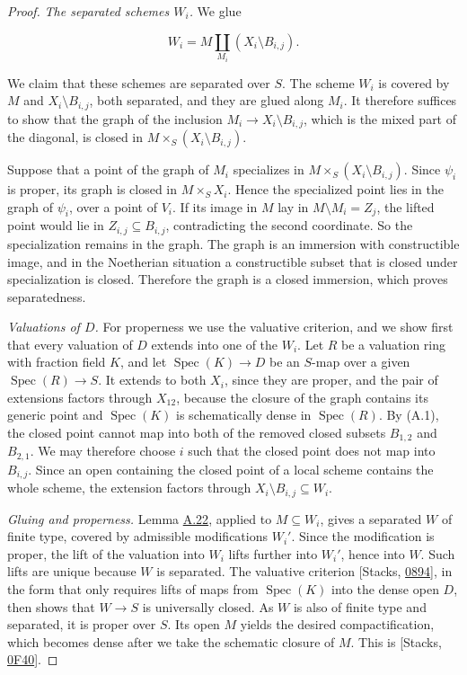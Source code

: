 \documentclass[11pt]{article}
\begin{document}
\begin{proof}[{Proof}]
\emph{The separated schemes \(W_i\).} We glue

\[
W_i=M\coprod_{M_i}(X_i\setminus B_{i,j}).
\]

We claim that these schemes are separated over \(S\). The scheme \(W_i\) is covered by \(M\) and \(X_i\setminus B_{i,j}\), both separated, and they are glued along \(M_i\). It therefore suffices to show that the graph of the inclusion \(M_i\to X_i\setminus B_{i,j}\), which is the mixed part of the diagonal, is closed in \(M\times_S(X_i\setminus B_{i,j})\).

Suppose that a point of the graph of \(M_i\) specializes in \(M\times_S(X_i\setminus B_{i,j})\). Since \(\psi_i\) is proper, its graph is closed in \(M\times_SX_i\). Hence the specialized point lies in the graph of \(\psi_i\), over a point of \(V_i\). If its image in \(M\) lay in \(M\setminus M_i=Z_j\), the lifted point would lie in \(Z_{i,j}\subseteq B_{i,j}\), contradicting the second coordinate. So the specialization remains in the graph. The graph is an immersion with constructible image, and in the Noetherian situation a constructible subset that is closed under specialization is closed. Therefore the graph is a closed immersion, which proves separatedness.

\emph{Valuations of \(D\).} For properness we use the valuative criterion, and we show first that every valuation of \(D\) extends into one of the \(W_i\). Let \(R\) be a valuation ring with fraction field \(K\), and let \(\operatorname{Spec}(K)\to D\) be an \(S\)-map over a given \(\operatorname{Spec}(R)\to S\). It extends to both \(X_i\), since they are proper, and the pair of extensions factors through \(X_{12}\), because the closure of the graph contains its generic point and \(\operatorname{Spec}(K)\) is schematically dense in \(\operatorname{Spec}(R)\). By (A.1), the closed point cannot map into both of the removed closed subsets \(B_{1,2}\) and \(B_{2,1}\). We may therefore choose \(i\) such that the closed point does not map into \(B_{i,j}\). Since an open containing the closed point of a local scheme contains the whole scheme, the extension factors through \(X_i\setminus B_{i,j}\subseteq W_i\).

\emph{Gluing and properness.} Lemma \hyperref[bp60]{A.22}, applied to \(M\subseteq W_i\), gives a separated \(W\) of finite type, covered by admissible modifications \(W_i'\). Since the modification is proper, the lift of the valuation into \(W_i\) lifts further into \(W_i'\), hence into \(W\). Such lifts are unique because \(W\) is separated. The valuative criterion [Stacks, \href{https://stacks.math.columbia.edu/tag/0894}{0894}], in the form that only requires lifts of maps from \(\operatorname{Spec}(K)\) into the dense open \(D\), then shows that \(W\to S\) is universally closed. As \(W\) is also of finite type and separated, it is proper over \(S\). Its open \(M\) yields the desired compactification, which becomes dense after we take the schematic closure of \(M\). This is [Stacks, \href{https://stacks.math.columbia.edu/tag/0F40}{0F40}].
\end{proof}
\end{document}
